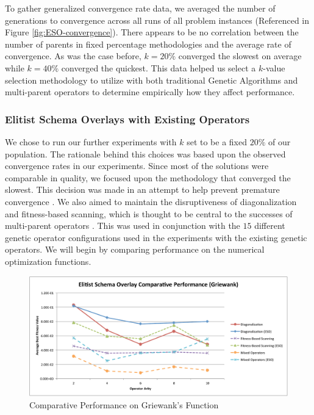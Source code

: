 To gather generalized convergence rate data, we averaged the number of generations to convergence across all runs of all problem instances (Referenced in Figure \ref{fig:ESO-convergence}). There appears to be no correlation between the number of parents in fixed percentage methodologies and the average rate of convergence. As was the case before, $k=20\%$ converged the slowest on average while $k=40\%$ converged the quickest. This data helped us select a $k$-value selection methodology to utilize with both traditional Genetic Algorithms and multi-parent operators to determine empirically how they affect performance.

\subsubsection*{Elitist Schema Overlays with Existing Operators}
We chose to run our further experiments with $k$ set to be a fixed $20\%$ of our population. The rationale behind this choices was based upon the observed convergence rates in our experiments. Since most of the solutions were comparable in quality, we focused upon the methodology that converged the slowest. This decision was made in an attempt to help prevent premature convergence \cite{Andre01}. We also aimed to maintain the disruptiveness of diagonalization and fitness-based scanning, which is thought to be central to the successes of multi-parent operators \cite{Eiben95}. This was used in conjunction with the $15$ different genetic operator configurations used in the experiments with the existing genetic operators. We will begin by comparing performance on the numerical optimization functions.

\begin{figure}[htbp!]
\centering
\includegraphics[scale=0.60]{charts/Both_Griewank.pdf}
\caption{Comparative Performance on Griewank's Function}
\label{fig:both_griewank}
\end{figure}

